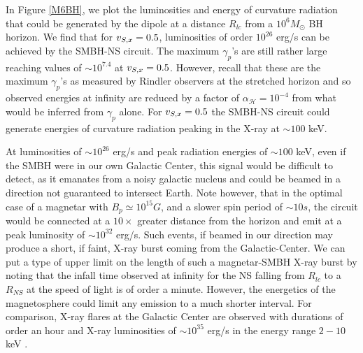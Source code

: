 In Figure \ref{M6BH}, we plot the luminosities and energy of curvature
radiation that could be generated by the dipole at a distance $R_{lc}$
from a $10^{6} M_{\odot}$ BH horizon. We find that for $v_{S, x} = 0.5$,
luminosities of order $10^{26}$ erg/s can be achieved by the SMBH-NS
circuit. The maximum $\gamma_p$'s are still rather large reaching
values of $\sim 10^{7.4}$ at $v_{S, x} = 0.5$. 
However, recall that these are 
the maximum $\gamma_p$'s as measured by Rindler observers at the 
stretched horizon and so observed energies at infinity are reduced by a 
factor of  $\alpha_{\mathcal{H}} = 10^{-4}$ from what would be inferred from
$\gamma_p$ alone. 
For $v_{S, x} =0.5$ the SMBH-NS circuit could generate
energies of curvature radiation peaking in the X-ray at $\sim 100$ keV.


At luminosities of $\sim 10^{26}$ erg/s and peak radiation energies of
$\sim 100$ keV, even if the SMBH were in our own Galactic Center, this
signal would be difficult to detect, as it emanates from
 a noisy galactic nucleus and could be beamed in a direction not guaranteed to intersect Earth.
Note however, that in the optimal case of a magnetar with $B_p \simeq
10^{15} G$, and a slower spin period of $\sim 10 s$, the circuit would
be connected at a $10 \times$ greater distance from the horizon and
emit at a peak luminosity of $\sim 10^{32}$ erg/s. 
Such events, if beamed in our direction may produce a short, if faint, X-ray burst
coming from the Galactic-Center.
We can put a type of upper limit on
the length of such a magnetar-SMBH X-ray burst by noting that the
infall time observed at infinity for the NS falling from $R_{lc}$ to a
$R_{NS}$ at the speed of light is of order a minute. However, the
energetics of the magnetosphere could limit any emission to a much
shorter interval. For comparison,
X-ray flares at the Galactic Center are observed with durations of order an hour and X-ray
luminosities of $\sim 10^{35}$ erg/s in the energy range $2-10$ keV
\citep{Degenaar:2012:GCXrayFlares}.
 


